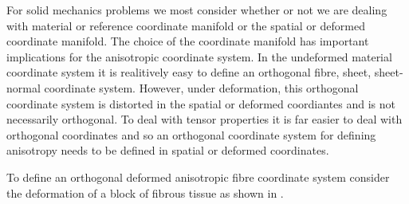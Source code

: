 For solid mechanics problems we most consider whether or not we are
dealing with material or reference coordinate manifold or the spatial
or deformed coordinate manifold. The choice of the coordinate manifold
has important implications for the anisotropic coordinate system. In
the undeformed material coordinate system it is realitively easy to
define an orthogonal fibre, sheet, sheet-normal coordinate
system. However, under deformation, this orthogonal coordinate system
is distorted in the spatial or deformed coordiantes and is not
necessarily orthogonal. To deal with tensor properties it is far
easier to deal with orthogonal coordinates and so an orthogonal
coordinate system for defining anisotropy needs to be defined in
spatial or deformed coordinates.

To define an orthogonal deformed anisotropic fibre coordinate system
consider the deformation of a block of fibrous tissue as shown in
.

